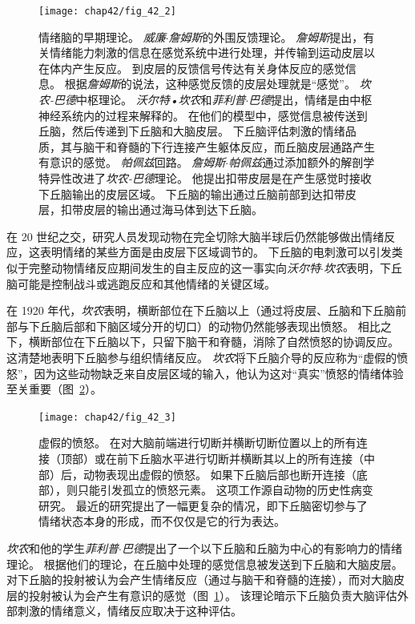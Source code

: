\begin{figure}[htbp]
	\centering
	\texttt{[image: chap42/fig\_42\_2]}
	\caption{情绪脑的早期理论\cite{ledoux1997emotional}。
		\textit{威廉$\cdot$詹姆斯}的外围反馈理论。
		\textit{詹姆斯}提出，有关情绪能力刺激的信息在感觉系统中进行处理，并传输到运动皮层以在体内产生反应。
		到皮层的反馈信号传达有关身体反应的感觉信息。
		根据\textit{詹姆斯}的说法，这种感觉反馈的皮层处理就是“感觉”。
		\textit{坎农-巴德}中枢理论。
		\textit{沃尔特•坎农}和\textit{菲利普$\cdot$巴德}提出，情绪是由中枢神经系统内的过程来解释的。
		在他们的模型中，感觉信息被传送到丘脑，然后传递到下丘脑和大脑皮层。
		下丘脑评估刺激的情绪品质，其与脑干和脊髓的下行连接产生躯体反应，而丘脑皮层通路产生有意识的感觉。
		\textit{帕佩兹}回路。
		\textit{詹姆斯$\cdot$帕佩兹}通过添加额外的解剖学特异性改进了\textit{坎农-巴德}理论。
		他提出扣带皮层是在产生感觉时接收下丘脑输出的皮层区域。
		下丘脑的输出通过丘脑前部到达扣带皮层，扣带皮层的输出通过海马体到达下丘脑。}
	\label{fig:42_2}
\end{figure}


在 20 世纪之交，研究人员发现动物在完全切除大脑半球后仍然能够做出情绪反应，这表明情绪的某些方面是由皮层下区域调节的。
下丘脑的电刺激可以引发类似于完整动物情绪反应期间发生的自主反应的这一事实向\textit{沃尔特$\cdot$坎农}表明，下丘脑可能是控制战斗或逃跑反应和其他情绪的关键区域。


在 1920 年代，\textit{坎农}表明，横断部位在下丘脑以上（通过将皮层、丘脑和下丘脑前部与下丘脑后部和下脑区域分开的切口）的动物仍然能够表现出愤怒。
相比之下，横断部位在下丘脑以下，只留下脑干和脊髓，消除了自然愤怒的协调反应。
这清楚地表明下丘脑参与组织情绪反应。
\textit{坎农}将下丘脑介导的反应称为“虚假的愤怒”，因为这些动物缺乏来自皮层区域的输入，他认为这对“真实”愤怒的情绪体验至关重要（图~\ref{fig:42_3}）。


\begin{figure}[htbp]
	\centering
	\texttt{[image: chap42/fig\_42\_3]}
	\caption{虚假的愤怒。
		在对大脑前端进行切断并横断切断位置以上的所有连接（顶部）或在前下丘脑水平进行切断并横断其以上的所有连接（中部）后，动物表现出虚假的愤怒。
		如果下丘脑后部也断开连接（底部），则只能引发孤立的愤怒元素。
		这项工作源自动物的历史性病变研究。
		最近的研究提出了一幅更复杂的情况，即下丘脑密切参与了情绪状态本身的形成，而不仅仅是它的行为表达。}
	\label{fig:42_3}
\end{figure}


\textit{坎农}和他的学生\textit{菲利普$\cdot$巴德}提出了一个以下丘脑和丘脑为中心的有影响力的情绪理论。
根据他们的理论，在丘脑中处理的感觉信息被发送到下丘脑和大脑皮层。
对下丘脑的投射被认为会产生情绪反应（通过与脑干和脊髓的连接），而对大脑皮层的投射被认为会产生有意识的感觉（图~\ref{fig:42_2}）。
该理论暗示下丘脑负责大脑评估外部刺激的情绪意义，情绪反应取决于这种评估。



